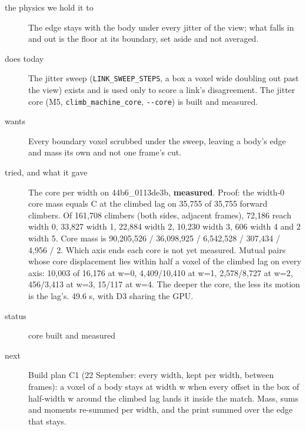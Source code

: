 \begin{description}
\item[{the physics we hold it to}] The edge stays with the body under every jitter of the view; what falls in and out is the floor at its boundary, set aside and not averaged.
\item[{does today}] The jitter sweep (\texttt{LINK\_\allowbreak{}SWEEP\_\allowbreak{}STEPS}, a box a voxel wide doubling out past the view) exists and is used only to score a link's disagreement. The jitter core (M5, \texttt{climb\_\allowbreak{}machine\_\allowbreak{}core}, \texttt{-\allowbreak{}-\allowbreak{}core}) is built and measured.
\item[{wants}] Every boundary voxel scrubbed under the sweep, leaving a body's edge and mass its own and not one frame's cut.
\item[{tried, and what it gave}] The core per width on 44b6\_\allowbreak{}0113de3b, \textbf{measured}. Proof: the width-0 core mass equals C at the climbed lag on 35,755 of 35,755 forward climbers. Of 161,708 climbers (both sides, adjacent frames), 72,186 reach width 0, 33,827 width 1, 22,884 width 2, 10,230 width 3, 606 width 4 and 2 width 5. Core mass is 90,205,526 / 36,098,925 / 6,542,528 / 307,434 / 4,956 / 2. Which axis ends each core is not yet measured. Mutual pairs whose core displacement lies within half a voxel of the climbed lag on every axis: 10,003 of 16,176 at w=0, 4,409/10,410 at w=1, 2,578/8,727 at w=2, 456/3,413 at w=3, 15/117 at w=4. The deeper the core, the less its motion is the lag's. 49.6 s, with D3 sharing the GPU.
\item[{status}] core built and measured
\item[{next}] Build plan C1 (22 September: every width, kept per width, between frames): a voxel of a body stays at width w when every offset in the box of half-width w around the climbed lag lands it inside the match. Mass, sums and moments re-summed per width, and the print summed over the edge that stays.
\end{description}


